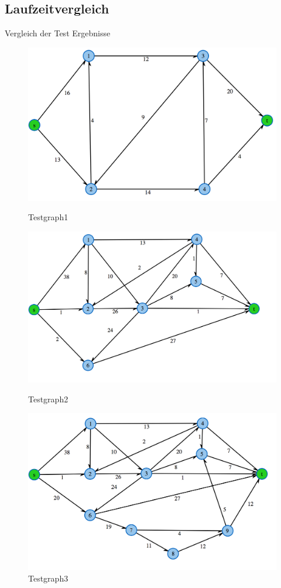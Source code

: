 \documentclass[a4paper]{llncs}
\begin{document}
\subsection{Laufzeitvergleich}
Vergleich der Test Ergebnisse

\begin{figure}[H]
  \centering
     \includegraphics[scale=0.2]{testgraph1} 
  \caption{Testgraph1}
  \label{fig:testgraph1} 
  \centering
     \includegraphics[scale=0.2]{testgraph2} 
  \caption{Testgraph2}
  \label{fig:testgraph2} 
  \centering
     \includegraphics[scale=0.2]{testgraph3} 
  \caption{Testgraph3}
  \label{fig:testgraph3}
\end{figure}
\citep{FordFulkersonOnline}
\end{document}
